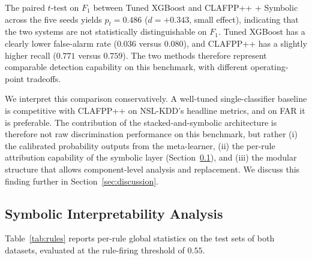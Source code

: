 \documentclass[pdflatex,sn-mathphys-num]{sn-jnl}
\theoremstyle{thmstyleone}
\theoremstyle{thmstyletwo}
\theoremstyle{thmstylethree}
\begin{document}
The paired $t$-test on $F_1$ between Tuned XGBoost and CLAFPP++ + Symbolic across the five seeds yields $p_t = 0.486$ ($d = +0.343$, small effect), indicating that the two systems are not statistically distinguishable on $F_1$. Tuned XGBoost has a clearly lower false-alarm rate ($0.036$ versus $0.080$), and CLAFPP++ has a slightly higher recall ($0.771$ versus $0.759$). The two methods therefore represent comparable detection capability on this benchmark, with different operating-point tradeoffs.

We interpret this comparison conservatively. A well-tuned single-classifier baseline is competitive with CLAFPP++ on NSL-KDD's headline metrics, and on FAR it is preferable. The contribution of the stacked-and-symbolic architecture is therefore not raw discrimination performance on this benchmark, but rather (i) the calibrated probability outputs from the meta-learner, (ii) the per-rule attribution capability of the symbolic layer (Section~\ref{sec:results-symbolic}), and (iii) the modular structure that allows component-level analysis and replacement. We discuss this finding further in Section~\ref{sec:discussion}.

\subsection{Symbolic Interpretability Analysis}\label{sec:results-symbolic}

Table~\ref{tab:rules} reports per-rule global statistics on the test sets of both datasets, evaluated at the rule-firing threshold of $0.55$.
\end{document}
